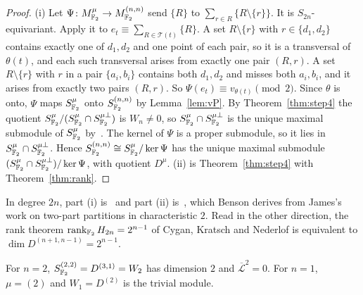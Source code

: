\begin{proof}
(i) Let $\Psi\colon M^\mu_{\mathbb{F}_2}\to M^{(n,n)}_{\mathbb{F}_2}$ send $\{R\}$ to $\sum_{r\in R}\{R\setminus\{r\}\}$. It is $S_{2n}$-equivariant. Apply it to $e_t\equiv\sum_{R\in\mathcal T(t)}\{R\}$. A set $R\setminus\{r\}$ with $r\in\{d_1,d_2\}$ contains exactly one of $d_1,d_2$ and one point of each pair, so it is a transversal of $\theta(t)$, and each such transversal arises from exactly one pair $(R,r)$. A set $R\setminus\{r\}$ with $r$ in a pair $\{a_i,b_i\}$ contains both $d_1,d_2$ and misses both $a_i,b_i$, and it arises from exactly two pairs $(R,r)$. So $\Psi(e_t)\equiv v_{\theta(t)}\pmod2$. Since $\theta$ is onto, $\Psi$ maps $S^\mu_{\mathbb{F}_2}$ onto $S^{(n,n)}_{\mathbb{F}_2}$ by Lemma~\ref{lem:vP}. By Theorem~\ref{thm:step4} the quotient $S^\mu_{\mathbb{F}_2}/(S^\mu_{\mathbb{F}_2}\cap S^{\mu\perp}_{\mathbb{F}_2})$ is $W_n\ne0$, so $S^\mu_{\mathbb{F}_2}\cap S^{\mu\perp}_{\mathbb{F}_2}$ is the unique maximal submodule of $S^\mu_{\mathbb{F}_2}$ by~\cite[Thm.~4.9]{James78}. The kernel of $\Psi$ is a proper submodule, so it lies in $S^\mu_{\mathbb{F}_2}\cap S^{\mu\perp}_{\mathbb{F}_2}$. Hence $S^{(n,n)}_{\mathbb{F}_2}\cong S^\mu_{\mathbb{F}_2}/\ker\Psi$ has the unique maximal submodule $(S^\mu_{\mathbb{F}_2}\cap S^{\mu\perp}_{\mathbb{F}_2})/\ker\Psi$, with quotient $D^\mu$. (ii) is Theorem~\ref{thm:step4} with Theorem~\ref{thm:rank}.
\end{proof}

In degree $2n$, part (i) is~\cite[Lemma~5.2]{Benson88} and part (ii) is~\cite[Lemma~5.3]{Benson88}, which Benson derives from James's work on two-part partitions in characteristic $2$. Read in the other direction, the rank theorem $\operatorname{rank}_{\mathbb{F}_2}H_{2n}=2^{n-1}$ of Cygan, Kratsch and Nederlof is equivalent to $\dim D^{(n+1,n-1)}=2^{n-1}$.

\begin{remark}\label{rem:specht}
For $n=2$, $S^{(2,2)}_{\mathbb{F}_2}=D^{(3,1)}=W_2$ has dimension $2$ and $\overline{\mathcal L}^2=0$. For $n=1$, $\mu=(2)$ and $W_1=D^{(2)}$ is the trivial module.
\end{remark}
